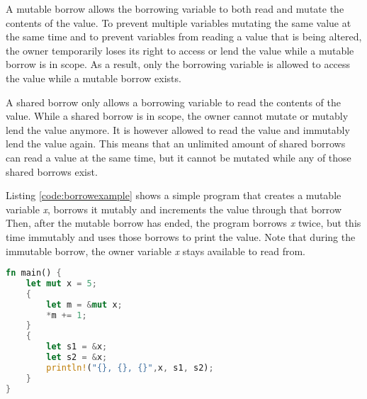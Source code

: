 A mutable borrow allows the borrowing variable to both read and mutate the contents of the value.
To prevent multiple variables mutating the same value at the same time and to prevent variables from reading a value that is being altered, the owner temporarily loses its right to access or lend the value while a mutable borrow is in scope.
As a result, only the borrowing variable is allowed to access the value while a mutable borrow exists.

A shared borrow only allows a borrowing variable to read the contents of the value.
While a shared borrow is in scope, the owner cannot mutate or mutably lend the value anymore.
It is however allowed to read the value and immutably lend the value again.
This means that an unlimited amount of shared borrows can read a value at the same time, but it cannot be mutated while any of those shared borrows exist.

Listing \ref{code:borrowexample} shows a simple program that creates a mutable variable \textit{x}, borrows it mutably and increments the value through that borrow 
Then, after the mutable borrow has ended, the program borrows \textit{x} twice, but this time immutably and uses those borrows to print the value. Note that during the immutable borrow, the owner variable \textit{x} stays available to read from.

\begin{lstlisting}[language=Rust,frame=single,caption=Borrowing an integer,label=code:borrowexample]
fn main() {
    let mut x = 5;
    {
        let m = &mut x;
        *m += 1;
    }
    {
        let s1 = &x;
        let s2 = &x;
        println!("{}, {}, {}",x, s1, s2);
    }
}
\end{lstlisting}

